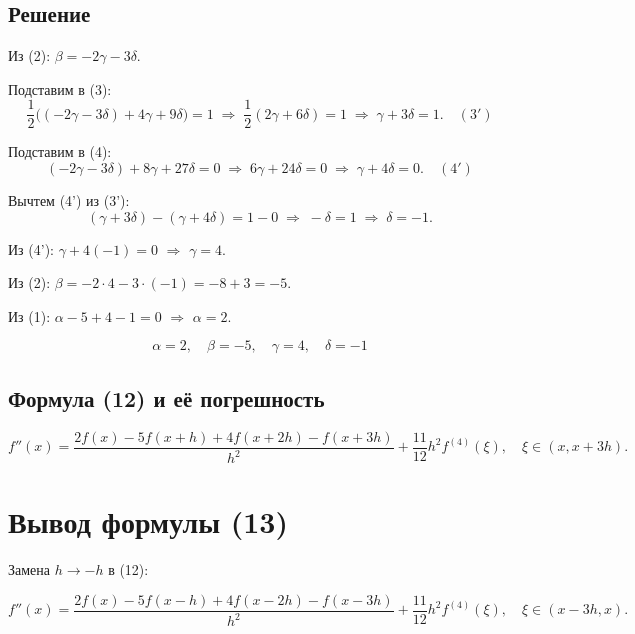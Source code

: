 \documentclass[a4paper,12pt]{article}
\begin{document}
	\subsection*{Решение}
	Из (2): \( \beta = -2\gamma - 3\delta \).
	
	Подставим в (3):
	\[
	\frac{1}{2}\bigl((-2\gamma-3\delta) + 4\gamma + 9\delta\bigr) = 1
	\;\Rightarrow\;
	\frac{1}{2}(2\gamma + 6\delta) = 1
	\;\Rightarrow\;
	\gamma + 3\delta = 1. \quad (3')
	\]
	
	Подставим в (4):
	\[
	(-2\gamma-3\delta) + 8\gamma + 27\delta = 0
	\;\Rightarrow\;
	6\gamma + 24\delta = 0
	\;\Rightarrow\;
	\gamma + 4\delta = 0. \quad (4')
	\]
	
	Вычтем (4') из (3'):
	\[
	(\gamma + 3\delta) - (\gamma + 4\delta) = 1 - 0
	\;\Rightarrow\;
	-\delta = 1
	\;\Rightarrow\;
	\delta = -1.
	\]
	
	Из (4'): \( \gamma + 4(-1) = 0 \) \( \Rightarrow \) \( \gamma = 4 \).
	
	Из (2): \( \beta = -2\cdot4 - 3\cdot(-1) = -8 + 3 = -5 \).
	
	Из (1): \( \alpha - 5 + 4 - 1 = 0 \) \( \Rightarrow \) \( \alpha = 2 \).
	
	\[
	\boxed{\alpha = 2,\quad \beta = -5,\quad \gamma = 4,\quad \delta = -1}
	\]
	
	\subsection*{Формула (12) и её погрешность}
	\[
	\boxed{f''(x) = \frac{2f(x) - 5f(x+h) + 4f(x+2h) - f(x+3h)}{h^2} + \frac{11}{12}h^2 f^{(4)}(\xi)},\quad \xi \in (x, x+3h).
	\]
	
	\section*{Вывод формулы (13)}
	
	Замена \( h \to -h \) в (12):
	
	\[
	\boxed{f''(x) = \frac{2f(x) - 5f(x-h) + 4f(x-2h) - f(x-3h)}{h^2} + \frac{11}{12}h^2 f^{(4)}(\xi)},\quad \xi \in (x-3h, x).
	\]
	
\end{document}
